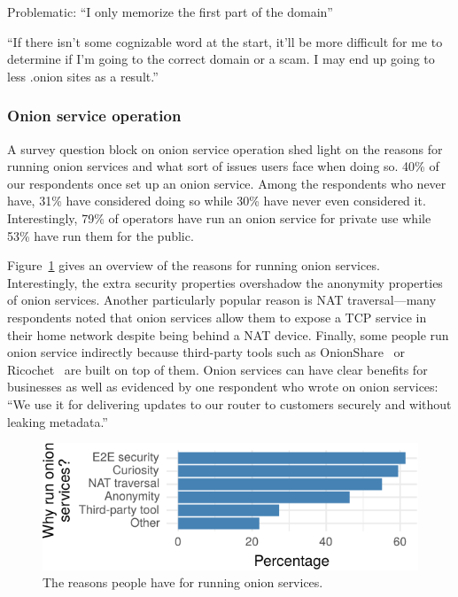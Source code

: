 Problematic:
``I only memorize the first part of the domain''

``If there isn't some cognizable word at the start, it'll be more difficult for
me to determine if I'm going to the correct domain or a scam. I may end up going
to less .onion sites as a result.''

\subsubsection{Onion service operation}

A survey question block on onion service operation shed light on the reasons for
running onion services and what sort of issues users face when doing so.  40\%
of our respondents once set up an onion service.  Among the respondents who
never have, 31\% have considered doing so while 30\% have never even considered
it.  Interestingly, 79\% of operators have run an onion service for private use
while 53\% have run them for the public.

Figure~\ref{fig:onion-operation-reasons} gives an overview of the reasons for
running onion services.  Interestingly, the extra security properties overshadow
the anonymity properties of onion services.  Another particularly popular reason
is NAT traversal---many respondents noted that onion services allow them to
expose a TCP service in their home network despite being behind a NAT device.
Finally, some people run onion service indirectly because third-party tools such
as OnionShare~\cite{onionshare} or Ricochet~\cite{ricochet} are built on top of
them.  Onion services can have clear benefits for businesses as well as
evidenced by one respondent who wrote on onion services: ``We use it for
delivering updates to our router to customers securely and without leaking
metadata.''

\begin{figure}[t]
    \centering
    \includegraphics[width=\linewidth]{figures/onion-operation-reasons.pdf}
    \caption{The reasons people have for running onion services.}
    \label{fig:onion-operation-reasons}
\end{figure}

